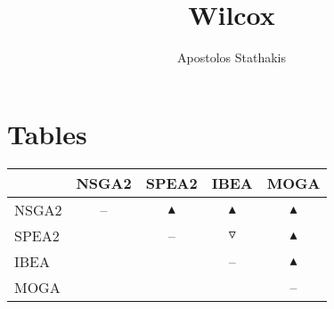 \documentclass{article}
\title{Wilcox}
\author{Apostolos Stathakis}
\begin{document}
 \maketitle
 \section{Tables}
 \begin{table}
 \centering \begin{tabular}{l c c c c }
  \hline & NSGA2 & SPEA2 & IBEA & MOGA \\
 \hline  NSGA2 &  --  & $\blacktriangle$ & $\blacktriangle$ & $\blacktriangle$ \\
  SPEA2 &   &  --  & $\triangledown$ & $\blacktriangle$ \\
  IBEA &   &   &  --  & $\blacktriangle$ \\
  MOGA &   &   &   &  --  \\
 \hline
 \end{tabular}
 \end{table}
 
\end{document}
